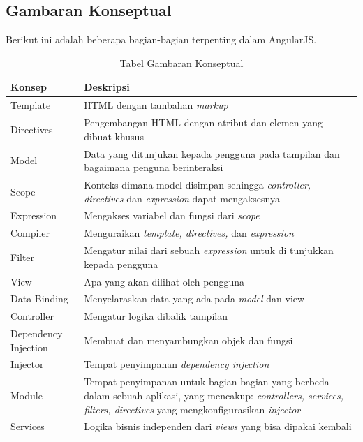 \subsection{Gambaran Konseptual}
\label{sub: gambaranKonsep}
	Berikut ini adalah beberapa bagian-bagian terpenting dalam AngularJS.
	\begin{table}[H]
		\centering
		\caption{Tabel Gambaran Konseptual}
		\begin{tabular}{| m{5cm} | m{10cm} |}
			\hline
			Konsep & Deskripsi \\
			\hline
			Template & HTML dengan tambahan \textit{markup} \\
			\hline
			Directives & Pengembangan HTML dengan atribut dan elemen yang dibuat khusus \\
			\hline
			Model & Data yang ditunjukan kepada pengguna pada tampilan dan bagaimana penguna berinteraksi \\
			\hline
			Scope & Konteks dimana model disimpan sehingga \textit{controller, directives} dan \textit{expression} dapat mengaksesnya \\
			\hline
			Expression & Mengakses variabel dan fungsi dari \textit{scope} \\
			\hline
			Compiler & Menguraikan \textit{template, directives,} dan \textit{expression} \\
			\hline
			Filter & Mengatur nilai dari sebuah \textit{expression} untuk di tunjukkan kepada pengguna \\
			\hline
			View & Apa yang akan dilihat oleh pengguna\\
			\hline
			Data Binding & Menyelaraskan data yang ada pada \textit{model} dan view \\
			\hline
			Controller & Mengatur logika dibalik tampilan \\
			\hline
			Dependency Injection & Membuat dan menyambungkan objek dan fungsi \\
			\hline
			Injector & Tempat penyimpanan \textit{dependency injection} \\
			\hline
			Module & Tempat penyimpanan untuk bagian-bagian yang berbeda dalam sebuah aplikasi, yang mencakup: \textit{controllers, services, filters, directives} yang mengkonfigurasikan \textit{injector} \\
			\hline
			Services & Logika bisnis independen dari \textit{views} yang bisa dipakai kembali  \\
			\hline
			\end{tabular}
		\end{table}
		
